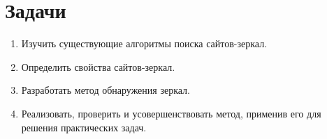\section{Задачи}
\begin{enumerate}
\item Изучить существующие алгоритмы поиска сайтов-зеркал.
\item Определить свойства сайтов-зеркал.
\item Разработать метод обнаружения зеркал.
\item Реализовать, проверить и усовершенствовать метод, применив его для решения практических задач.
\end{enumerate}